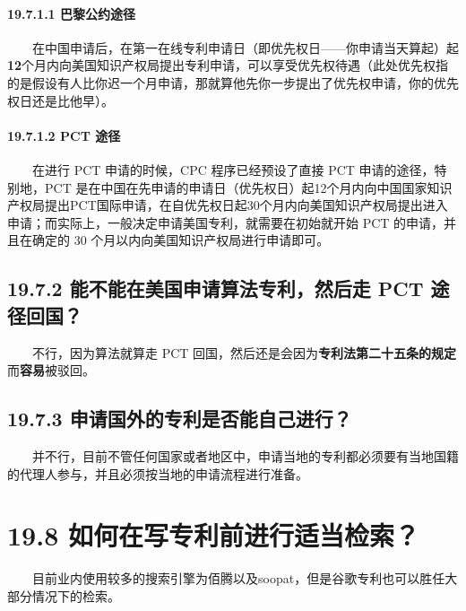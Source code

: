 \paragraph{19.7.1.1
巴黎公约途径}\label{ux5df4ux9eceux516cux7ea6ux9014ux5f84}

  在中国申请后，在第一在线专利申请日（即优先权日------你申请当天算起）起\textbf{12}个月内向美国知识产权局提出专利申请，可以享受优先权待遇（此处优先权指的是假设有人比你迟一个月申请，那就算他先你一步提出了优先权申请，你的优先权日还是比他早）。

\paragraph{19.7.1.2 PCT 途径}\label{pct-ux9014ux5f84}

  在进行 PCT 申请的时候，CPC 程序已经预设了直接 PCT
申请的途径，特别地，PCT
是在中国在先申请的申请日（优先权日）起12个月内向中国国家知识产权局提出PCT国际申请，在自优先权日起30个月内向美国知识产权局提出进入申请；而实际上，一般决定申请美国专利，就需要在初始就开始
PCT 的申请，并且在确定的 30 个月以内向美国知识产权局进行申请即可。

\subsection{19.7.2 能不能在美国申请算法专利，然后走 PCT
途径回国？}\label{ux80fdux4e0dux80fdux5728ux7f8eux56fdux7533ux8bf7ux7b97ux6cd5ux4e13ux5229ux7136ux540eux8d70-pct-ux9014ux5f84ux56deux56fd}

  不行，因为算法就算走 PCT
回国，然后还是会因为\textbf{专利法第二十五条的规定}而\textbf{容易}被驳回。

\subsection{19.7.3
申请国外的专利是否能自己进行？}\label{ux7533ux8bf7ux56fdux5916ux7684ux4e13ux5229ux662fux5426ux80fdux81eaux5df1ux8fdbux884c}

  并不行，目前不管任何国家或者地区中，申请当地的专利都必须要有当地国籍的代理人参与，并且必须按当地的申请流程进行准备。

\section{19.8
如何在写专利前进行适当检索？}\label{ux5982ux4f55ux5728ux5199ux4e13ux5229ux524dux8fdbux884cux9002ux5f53ux68c0ux7d22}

  目前业内使用较多的搜索引擎为佰腾以及soopat，但是谷歌专利也可以胜任大部分情况下的检索。

